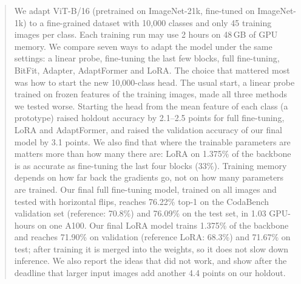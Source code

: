\begin{abstract}
We adapt ViT-B/16 (pretrained on ImageNet-21k, fine-tuned on ImageNet-1k) to a fine-grained dataset with 10,000 classes and only 45 training images per class.
Each training run may use 2 hours on 48\,GB of GPU memory.
We compare seven ways to adapt the model under the same settings: a linear probe, fine-tuning the last few blocks, full fine-tuning, BitFit, Adapter, AdaptFormer and LoRA.
The choice that mattered most was how to start the new 10,000-class head.
The usual start, a linear probe trained on frozen features of the training images, made all three methods we tested worse.
Starting the head from the mean feature of each class (a prototype) raised holdout accuracy by 2.1--2.5 points for full fine-tuning, LoRA and AdaptFormer, and raised the validation accuracy of our final model by 3.1 points.
We also find that where the trainable parameters are matters more than how many there are: LoRA on 1.375\% of the backbone is as accurate as fine-tuning the last four blocks (33\%).
Training memory depends on how far back the gradients go, not on how many parameters are trained.
Our final full fine-tuning model, trained on all images and tested with horizontal flips, reaches 76.22\% top-1 on the CodaBench validation set (reference: 70.8\%) and 76.09\% on the test set, in 1.03 GPU-hours on one A100.
Our final LoRA model trains 1.375\% of the backbone and reaches 71.90\% on validation (reference LoRA: 68.3\%) and 71.67\% on test; after training it is merged into the weights, so it does not slow down inference.
We also report the ideas that did not work, and show after the deadline that larger input images add another 4.4 points on our holdout.
\end{abstract}
